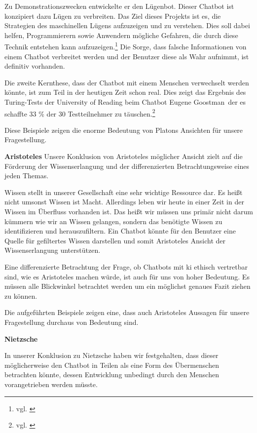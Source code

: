 Zu Demonstrationszwecken entwickelte er den Lügenbot. Dieser Chatbot ist konzipiert dazu Lügen zu verbreiten. 
Das Ziel dieses Projekts ist es, die Strategien des maschinellen Lügens aufzuzeigen und zu verstehen. 
Dies soll dabei helfen, Programmierern sowie Anwendern mögliche Gefahren, die durch diese Technik entstehen kann aufzuzeigen.\footnote{vgl. \cite{Bendel}}  Die Sorge, dass falsche Informationen von einem Chatbot verbreitet werden und der Benutzer diese als Wahr aufnimmt, ist definitiv vorhanden.

Die zweite Kernthese, dass der Chatbot mit einem Menschen verwechselt werden könnte, ist zum Teil in der heutigen Zeit schon real.
Dies zeigt das Ergebnis des Turing-Tests der University of Reading beim Chatbot \glqq Eugene Goostman\grqq\, der es schaffte 33 \% der 30 Testteilnehmer zu täuschen.\footnote{vgl. \cite{UnivOfReading}} 

Diese Beispiele zeigen die enorme Bedeutung von Platons Ansichten für unsere Fragestellung. 

\textbf{Aristoteles}
Unsere Konklusion von Aristoteles möglicher Ansicht zielt auf die Förderung der Wissenserlangung und der differenzierten Betrachtungsweise eines jeden Themas.

Wissen stellt in unserer Gesellschaft eine sehr wichtige Ressource dar. Es heißt nicht umsonst \glqq Wissen ist Macht\grqq. Allerdings leben wir heute in einer Zeit in der Wissen im Überfluss vorhanden ist. Das heißt wir müssen uns primär nicht darum kümmern wie wir an Wissen gelangen, sondern das benötigte Wissen zu identifizieren und herauszufiltern.
Ein Chatbot könnte für den Benutzer eine Quelle für gefiltertes Wissen darstellen und somit Aristoteles Ansicht der Wissenserlangung unterstützen.

Eine differenzierte Betrachtung der Frage, ob Chatbots mit \ac{ki} ethisch vertretbar sind, wie es Aristoteles machen würde, ist auch für uns von hoher Bedeutung. Es müssen alle Blickwinkel betrachtet werden um ein möglichst genaues Fazit ziehen zu können.
 
Die aufgeführten Beispiele zeigen eine, dass auch Aristoteles Aussagen für unsere Fragestellung durchaus von Bedeutung sind. 

\textbf{Nietzsche}

In unserer Konklusion zu Nietzsche haben wir festgehalten, dass dieser möglicherweise den Chatbot in Teilen als eine Form des Übermenschen betrachten könnte, dessen Entwicklung unbedingt durch den Menschen vorangetrieben werden müsste.


